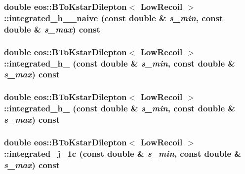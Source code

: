 \hypertarget{classeos_1_1BToKstarDilepton_3_01LowRecoil_01_4_a24cdee87f3e6388061dd8f62a32489d5}{
\subsubsection[{integrated\_\-h\_\-3\_\-naive}]{\setlength{\rightskip}{0pt plus 5cm}double eos::BToKstarDilepton$<$ {\bf LowRecoil} $>$::integrated\_\-h\_\_\-naive (const double \& {\em s\_\-min}, \/  const double \& {\em s\_\-max}) const}}
\label{classeos_1_1BToKstarDilepton_3_01LowRecoil_01_4_a24cdee87f3e6388061dd8f62a32489d5}
\hypertarget{classeos_1_1BToKstarDilepton_3_01LowRecoil_01_4_a14f75e87e86274e5f7b28039f9bd6b5c}{
\subsubsection[{integrated\_\-h\_\-4}]{\setlength{\rightskip}{0pt plus 5cm}double eos::BToKstarDilepton$<$ {\bf LowRecoil} $>$::integrated\_\-h\_ (const double \& {\em s\_\-min}, \/  const double \& {\em s\_\-max}) const}}
\label{classeos_1_1BToKstarDilepton_3_01LowRecoil_01_4_a14f75e87e86274e5f7b28039f9bd6b5c}
\hypertarget{classeos_1_1BToKstarDilepton_3_01LowRecoil_01_4_a5ee3c88bdfccb58ee217b79aa947c4b4}{
\subsubsection[{integrated\_\-h\_\-5}]{\setlength{\rightskip}{0pt plus 5cm}double eos::BToKstarDilepton$<$ {\bf LowRecoil} $>$::integrated\_\-h\_ (const double \& {\em s\_\-min}, \/  const double \& {\em s\_\-max}) const}}
\label{classeos_1_1BToKstarDilepton_3_01LowRecoil_01_4_a5ee3c88bdfccb58ee217b79aa947c4b4}
\hypertarget{classeos_1_1BToKstarDilepton_3_01LowRecoil_01_4_a5d9d3e3290c20f4a7019bf449f6b0e62}{
\subsubsection[{integrated\_\-j\_\-1c}]{\setlength{\rightskip}{0pt plus 5cm}double eos::BToKstarDilepton$<$ {\bf LowRecoil} $>$::integrated\_\-j\_\-1c (const double \& {\em s\_\-min}, \/  const double \& {\em s\_\-max}) const}}
